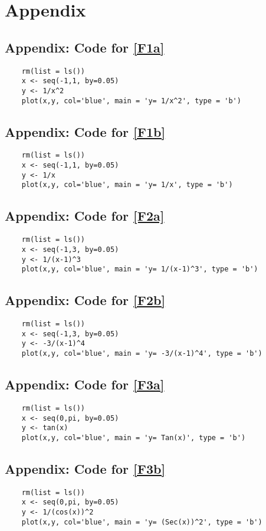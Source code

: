 \chapter{Appendix}
\section{Appendix: Code for \autoref{F1a}}
\begin{lstlisting}
	rm(list = ls())
	x <- seq(-1,1, by=0.05)
	y <- 1/x^2
	plot(x,y, col='blue', main = 'y= 1/x^2', type = 'b')
\end{lstlisting}

\section{Appendix: Code for \autoref{F1b}}
\begin{lstlisting}
	rm(list = ls())
	x <- seq(-1,1, by=0.05)
	y <- 1/x
	plot(x,y, col='blue', main = 'y= 1/x', type = 'b')
\end{lstlisting}

\section{Appendix: Code for \autoref{F2a}}
\begin{lstlisting}
	rm(list = ls())
	x <- seq(-1,3, by=0.05)
	y <- 1/(x-1)^3
	plot(x,y, col='blue', main = 'y= 1/(x-1)^3', type = 'b')
\end{lstlisting}

\section{Appendix: Code for \autoref{F2b}}
\begin{lstlisting}
	rm(list = ls())
	x <- seq(-1,3, by=0.05)
	y <- -3/(x-1)^4
	plot(x,y, col='blue', main = 'y= -3/(x-1)^4', type = 'b')
\end{lstlisting}

\section{Appendix: Code for \autoref{F3a}}
\begin{lstlisting}
	rm(list = ls())
	x <- seq(0,pi, by=0.05)
	y <- tan(x)
	plot(x,y, col='blue', main = 'y= Tan(x)', type = 'b')
\end{lstlisting}

\section{Appendix: Code for \autoref{F3b}}
\begin{lstlisting}
	rm(list = ls())
	x <- seq(0,pi, by=0.05)
	y <- 1/(cos(x))^2
	plot(x,y, col='blue', main = 'y= (Sec(x))^2', type = 'b')
\end{lstlisting}
